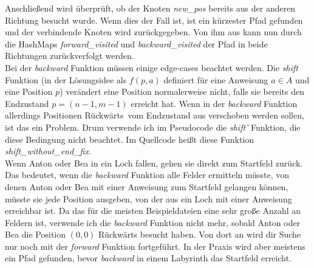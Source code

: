 \documentclass[a4paper,10pt,ngerman]{scrartcl}
\begin{document}
    Anschließend wird überprüft, ob der Knoten \textit{new\_pos} bereits aus der anderen Richtung besucht wurde. Wenn dies der Fall ist, ist ein kürzester Pfad gefunden und der verbindende Knoten wird zurückgegeben. Von ihm aus kann nun durch die HashMaps \textit{forward\_visited} und \textit{backward\_visited} der Pfad in beide Richtungen zurückverfolgt werden. \\
    Bei der \textit{backward} Funktion müssen einige edge-cases beachtet werden. Die \textit{shift} Funktion (in der Lösungsidee als $f(p,a)$ definiert für eine Anweisung $a \in A$ und eine Position $p$) verändert eine Position normalerweise nicht, falls sie bereits den Endzustand $p = (n-1, m-1)$ erreicht hat. Wenn in der \textit{backward} Funktion allerdings Positionen \glqq Rückwärts\grqq~vom Endzustand aus verschoben werden sollen, ist das ein Problem. Drum verwende ich im Pseudocode die \textit{shift'} Funktion, die diese Bedingung nicht beachtet. Im Quellcode heißt diese Funktion \textit{shift\_without\_end\_fix}. \\
    Wenn Anton oder Bea in ein Loch fallen, gehen sie direkt zum Startfeld zurück. Das bedeutet, wenn die \textit{backward} Funktion alle Felder ermitteln müsste, von denen Anton oder Bea mit einer Anweisung zum Startfeld gelangen können, müsste sie jede Position ausgeben, von der aus ein Loch mit einer Anweisung erreichbar ist. Da das für die meisten Beispieldateien eine sehr große Anzahl an Feldern ist, verwende ich die \textit{backward} Funktion nicht mehr, sobald Anton oder Bea die Position $(0,0)$ Rückwärts besucht haben. Von dort an wird dir Suche nur noch mit der \textit{forward} Funktion fortgeführt. In der Praxis wird aber meistens ein Pfad gefunden, bevor \textit{backward} in einem Labyrinth das Startfeld erreicht.
\end{document}
